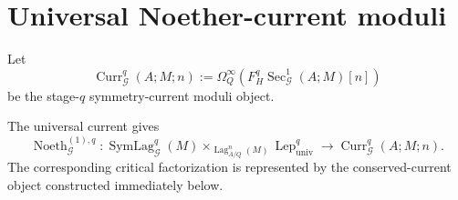 \section{Universal Noether-current moduli}
\label{sec:symmetry-noether-universal-noether-current-moduli}

Let
\[
\operatorname{Curr}_{\mathcal G}^{q}(A;M;n)
:=
\Omega_Q^\infty
\left(
F_H^q
\operatorname{Sec}_{\mathcal G}^1(A;M)[n]
\right)
\]
be the stage-$q$ symmetry-current moduli object.

\begin{construction}
\label{constr:symmetry-noether-universal-noether-map}
The universal current gives
\[
\operatorname{Noeth}_{\mathcal G}^{(1),q}:
\operatorname{SymLag}_{\mathcal G}^{q}(M)
\times_{\operatorname{Lag}_{A/Q}^n(M)}
\operatorname{Lep}_{\mathrm{univ}}^q
\longrightarrow
\operatorname{Curr}_{\mathcal G}^{q}(A;M;n).
\]
The corresponding critical factorization is represented by the conserved-current
object constructed immediately below.
\end{construction}


